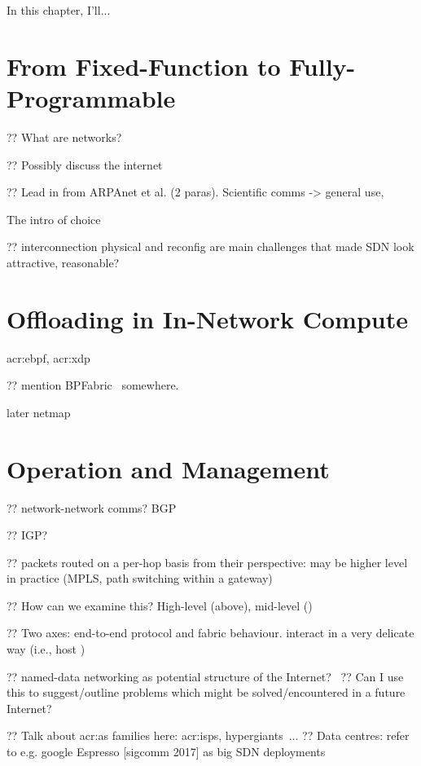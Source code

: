 In this chapter, I'll...
\section{From Fixed-Function to Fully-Programmable}

?? What are networks?

?? Possibly discuss the internet

?? Lead in from ARPAnet et al. (2 paras). Scientific comms -> general use,

The intro of choice~\parencite{DBLP:journals/ccr/FeamsterRZ14}

?? interconnection physical and reconfig are main challenges that made SDN look attractive, reasonable?

\section{Offloading in In-Network Compute}

\gls{acr:ebpf}, \gls{acr:xdp}~\parencite{DBLP:conf/conext/Hoiland-Jorgensen18}

?? mention BPFabric~\parencite{DBLP:conf/ancs/JouetP17} somewhere.

later netmap~\parencite{DBLP:conf/usenix/Rizzo12}

\section{Operation and Management}

?? network-network comms? BGP

?? IGP?

?? packets routed on a per-hop basis from their perspective: may be higher level in practice (MPLS, path switching within a gateway)

?? How can we examine this? High-level (above), mid-level ()

?? Two axes: end-to-end protocol and fabric behaviour. interact in a very delicate way (i.e., host )

?? named-data networking as potential structure of the Internet?~\parencite{DBLP:journals/ccr/0001ABJcCPWZ14}
?? Can I use this to suggest/outline problems which might be solved/encountered in a future Internet?

?? Talk about \gls{acr:as} families here: \glspl{acr:isp}, hypergiants~\parencite{DBLP:conf/sigcomm/GigisCMNKDKS21}...
?? Data centres: refer to e.g. google Espresso [sigcomm 2017] as big SDN deployments

